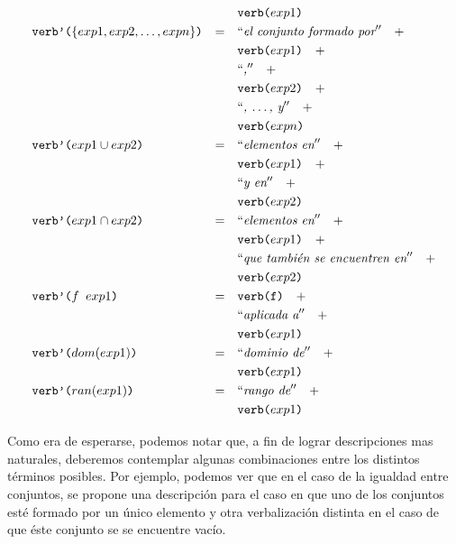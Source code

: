 \begin{align*}
& &											 		& \nlgfun{verb($exp1$)} \\
&\nlgfun{verb'($\{exp1, exp2, \ldots ,expn\}$)} & = \quad & \nlgtext{el conjunto formado por} \quad +  \\
& &											 		& \nlgfun{verb($exp1$)} \quad +  \\
& &											 		& \nlgtext{,} \quad +  \\
& &											 		& \nlgfun{verb($exp2$)} \quad +  \\
& &											 		& \nlgtext{, \ldots , y} \quad +  \\
& &											 		& \nlgfun{verb($expn$)} \\
&\nlgfun{verb'($exp1 \cup exp2$)} & = \quad & \nlgtext{elementos en} \quad +  \\
& &											 		& \nlgfun{verb($exp1$)} \quad +  \\
& &											 		& \nlgtext{y en} \quad +  \\
& &											 		& \nlgfun{verb($exp2$)} \\
&\nlgfun{verb'($exp1 \cap exp2$)} & = \quad & \nlgtext{elementos en} \quad +  \\
& &											 		& \nlgfun{verb($exp1$)} \quad +  \\
& &											 		& \nlgtext{que también se encuentren en} \quad +  \\
& &											 		& \nlgfun{verb($exp2$)} \\
&\nlgfun{verb'($f~exp1$)} & = \quad & \nlgfun{verb(f)} \quad +  \\
& &											 		& \nlgtext{aplicada a} \quad +  \\
& &											 		& \nlgfun{verb($exp1$)} \\
&\nlgfun{verb'($dom(exp1)$)} & = \quad & \nlgtext{dominio de} \quad +  \\
& &											 		& \nlgfun{verb($exp1$)} \\
&\nlgfun{verb'($ran(exp1)$)} & = \quad & \nlgtext{rango de} \quad +  \\
& &											 		& \nlgfun{verb($exp1$)} \\
\end{align*} 

\bigskip
Como era de esperarse, podemos notar que, a fin de lograr descripciones mas naturales, deberemos contemplar algunas combinaciones entre los distintos términos posibles. Por ejemplo, podemos ver que en el caso de la igualdad entre conjuntos, se propone una descripción para el caso en que uno de los conjuntos esté formado por un único elemento y otra verbalización distinta en el caso de que éste conjunto se se encuentre vacío.

